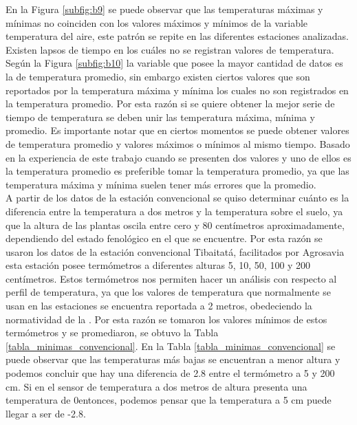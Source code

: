 En la Figura \ref{subfig:b9} se puede observar que las temperaturas máximas y mínimas no coinciden con los valores máximos y mínimos de la variable temperatura del aire, este patrón se repite en las diferentes estaciones analizadas. Existen lapsos de tiempo en los cuáles no se registran valores de temperatura. Según la Figura \ref{subfig:b10} la variable que posee la mayor cantidad de datos es la de temperatura promedio, sin embargo existen ciertos valores que son reportados por la temperatura máxima y mínima los cuales no son registrados en la temperatura promedio. Por esta razón si se quiere obtener la mejor serie de tiempo de temperatura se deben unir las temperatura máxima, mínima y promedio. Es importante notar que en ciertos momentos se puede obtener valores de temperatura promedio y valores máximos o mínimos al mismo tiempo. Basado en la experiencia de este trabajo cuando se presenten dos valores y uno de ellos es la temperatura promedio es preferible tomar la temperatura promedio, ya que las temperatura máxima y mínima suelen tener más errores que la promedio.\\


A partir de los datos de la estación convencional se quiso determinar cuánto es la diferencia entre la temperatura a dos metros y la temperatura sobre el suelo, ya que la altura de las plantas oscila entre cero y 80 centímetros aproximadamente, dependiendo del estado fenológico en el que se encuentre. Por esta razón se usaron los datos de la estación convencional Tibaitatá, facilitados por Agrosavia esta estación posee termómetros a diferentes alturas 5, 10, 50, 100 y 200 centímetros. Estos termómetros nos permiten hacer un análisis con respecto al perfil de temperatura, ya que los valores de temperatura que normalmente se usan en las estaciones se encuentra reportada a 2 metros, obedeciendo la normatividad de la \citet{WMO2010}. Por esta razón se tomaron los valores mínimos de estos termómetros y se promediaron, se obtuvo la Tabla \ref{tabla_minimas_convencional}. En la Tabla \ref{tabla_minimas_convencional} se puede observar que las temperaturas más bajas se encuentran a menor altura y podemos concluir que hay una diferencia de 2.8 \celsius entre el termómetro a 5 y 200 cm. Si en el sensor de temperatura a dos metros de altura presenta una temperatura de 0\celsius entonces, podemos pensar que la temperatura a 5 cm puede llegar a ser de -2.8\celsius.\\

